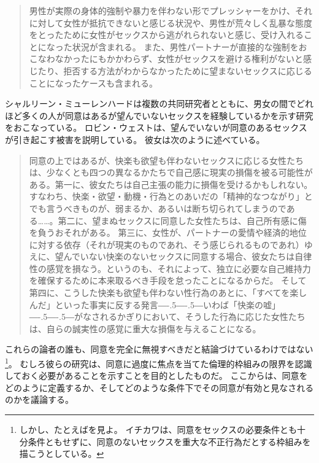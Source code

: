 \documentclass[paper=a4,book,openany]{jlreq}
\newcommand{\ig}[1]{}           %
\def\DDASH{―\kern-.5\zw―\kern-.5\zw―} %
\begin{document}
\begin{quote}
男性が実際の身体的強制や暴力を伴わない形でプレッシャーをかけ、それに対して女性が抵抗できないと感じる状況や、男性が荒々しく乱暴な態度をとったために女性がセックスから逃がれられないと感じ、受け入れることになった状況が含まれる。
また、男性パートナーが直接的な強制をおこなわなかったにもかかわらず、女性がセックスを避ける権利がないと感じたり、拒否する方法がわからなかったために望まないセックスに応じることになったケースも含まれる。
\citep[p.136]{gavey04:_just_sex}
\end{quote}

シャルリーン・ミューレンハードは複数の共同研究者とともに、男女の間でどれほど多くの人が同意はあるが望んでいないセックスを経験しているかを示す研究をおこなっている\citep[cf.][]{muehlenhard05:_wantin_not_wantin_sex,peterson07:_concep_wanted_women_consen_noncon_sexual_exper}。
ロビン・ウェスト\ig{Robin West}は、望んでいないが同意のあるセックスが引き起こす被害を説明している。
彼女は次のように述べている。

\begin{quote}
同意の上ではあるが、快楽も欲望も伴わないセックスに応じる女性たちは、少なくとも四つの異なるかたちで自己感に現実の損傷を被る可能性がある。第一に、彼女たちは自己主張の能力に損傷を受けるかもしれない。すなわち、快楽・欲望・動機・行為とのあいだの「精神的なつながり」とでも言うべきものが、弱まるか、あるいは断ち切られてしまうのである……。第二に、望まぬセックスに同意した女性たちは、自己所有感に傷を負うおそれがある。
第三に、女性が、パートナーの愛情や経済的地位に対する依存（それが現実のものであれ、そう感じられるものであれ）ゆえに、望んでいない快楽のないセックスに同意する場合、彼女たちは自律性の感覚を損なう。というのも、それによって、独立に必要な自己維持力を確保するために本来取るべき手段を怠ったことになるからだ。
そして第四に、こうした快楽も欲望も伴わない性行為のあとに、「すべてを楽しんだ」といった事実に反する発言{\DDASH}いわば「快楽の嘘」{\DDASH}がなされるかぎりにおいて、そうした行為に応じた女性たちは、自らの誠実性の感覚に重大な損傷を与えることになる。\citep[p.53]{west95:_harms_of_consen_sex}
\end{quote}

これらの論者の誰も、同意を完全に無視すべきだと結論づけているわけではない\footnote{しかし、たとえば\citet{ichikawa20:_presup_consen}を見よ。
イチカワは、同意をセックスの必要条件とも十分条件ともせずに、同意のないセックスを重大な不正行為だとする枠組みを描こうとしている。
\nocite{ichikawa20:_presup_consen}}。
むしろ彼らの研究は、同意に過度に焦点を当てた倫理的枠組みの限界を認識しておく必要があることを示すことを目的としたものだ。
ここからは、同意をどのように定義するか、そしてどのような条件下でその同意が有効と見なされるのかを議論する。
\end{document}
